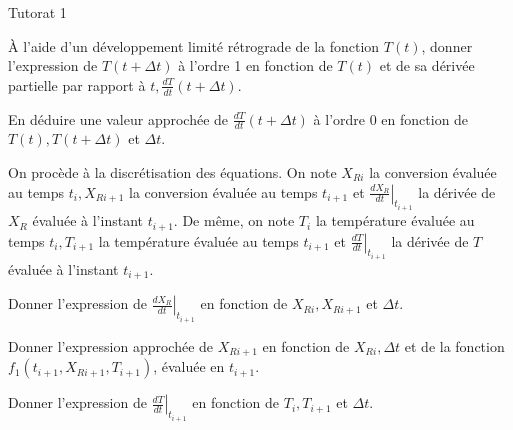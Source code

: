\begin{exo}[PC][1][python]{Tutorat 1}
\begin{quest}
  \item À l'aide d'un développement limité rétrograde de la fonction \(T(t)\), donner l'expression de \(T(t+\Delta t)\) à l'ordre 1 en fonction de \(T(t)\) et de sa dérivée partielle par rapport à \(t, \frac{d T}{d t}(t+\Delta t)\).
  
  \item En déduire une valeur approchée de \(\frac{d T}{d t}(t+\Delta t)\) à l'ordre 0 en fonction de \(T(t), T(t+\Delta t)\) et \(\Delta t\).
\end{quest}

On procède à la discrétisation des équations. On note \(X_{R i}\) la conversion évaluée au temps \(t_{i}, X_{R i+1}\) la conversion évaluée au temps \(t_{i+1}\) et \(\left.\frac{d X_{R}}{d t}\right|_{t_{i+1}}\) la dérivée de \(X_{R}\) évaluée à l'instant \(t_{i+1}\). De même, on note \(T_{i}\) la température évaluée au temps \(t_{i}, T_{i+1}\) la température évaluée au temps \(t_{i+1}\) et \(\left.\frac{d T}{d t}\right|_{t_{i+1}}\) la dérivée de \(T\) évaluée à l'instant \(t_{i+1}\).
\begin{quest}
  
  \item Donner l'expression de \(\left.\frac{d X_{R}}{d t}\right|_{t_{i+1}}\) en fonction de \(X_{R i}, X_{R i+1}\) et \(\Delta t\).
  \item Donner l'expression approchée de \(X_{R i+1}\) en fonction de \(X_{R i}, \Delta t\) et de la fonction \(f_{1}\left(t_{i+1}, X_{R i+1}, T_{i+1}\right)\), évaluée en \(t_{i+1}\).
  
  \item Donner l'expression de \(\left.\frac{d T}{d t}\right|_{t_{i+1}}\) en fonction de \(T_{i}, T_{i+1}\) et \(\Delta t\).
  

\end{quest}
\end{exo}
